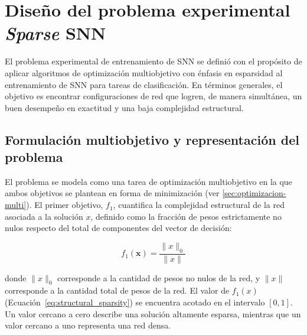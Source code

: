 




\section{Diseño del problema experimental \textit{Sparse} SNN}
El problema experimental de entrenamiento de SNN se definió con el propósito de aplicar algoritmos de optimización multiobjetivo con énfasis en esparsidad al entrenamiento de SNN para tareas de clasificación. En términos generales, el objetivo es encontrar configuraciones de red que logren, de manera simultánea, un buen desempeño en exactitud y una baja complejidad estructural.

\subsection{Formulación multiobjetivo y representación del problema}\label{subsec:formulacion_representacion}
El problema se modela como una tarea de optimización multiobjetivo en la que ambos objetivos se plantean en forma de minimización (ver \ref{sec:optimizacion-multi}). El primer objetivo, $f_1$, cuantifica la complejidad estructural de la red asociada a la solución $x$, definido como la fracción de pesos estrictamente no nulos respecto del total de componentes del vector de decisión:

\begin{equation}
f_1(\mathbf{x}) =
\dfrac{\|x\|_0}{\|x\|}
\label{eq:structural_sparsity}
\end{equation}

donde $\|x\|_0$ corresponde a la cantidad de pesos no nulos de la red, y $\|x\|$ corresponde a la cantidad total de pesos de la red. El valor de $f_1(x)$ (Ecuación~\ref{eq:structural_sparsity}) se encuentra acotado en el intervalo $[0,1]$. Un valor cercano a cero describe una solución altamente esparsa, mientras que un valor cercano a uno representa una red densa.

